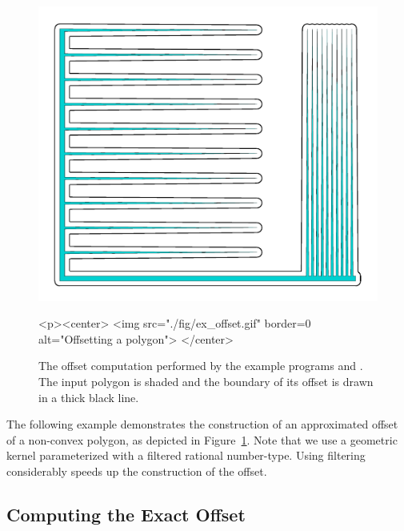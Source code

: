 \begin{figure}[t]
\begin{ccTexOnly}
  \begin{center}
    \includegraphics{Minkowski_sum_2/fig/ex_offset} 
  \end{center}
\end{ccTexOnly}
\begin{ccHtmlOnly}
  <p><center>
  <img src="./fig/ex_offset.gif" border=0 alt="Offsetting a polygon">
  </center>
\end{ccHtmlOnly}
\caption{The offset computation performed by the example programs
 and . The input polygon
is shaded and the boundary of its offset is drawn in a thick black line.}
\label{mink_fig:ex_offset}
\end{figure}

The following example demonstrates the construction of an approximated
offset of a non-convex polygon, as depicted in
Figure~\ref{mink_fig:ex_offset}. Note that we use a geometric kernel
parameterized with a filtered rational number-type. Using filtering
considerably speeds up the construction of the offset.


\subsection{Computing the Exact Offset}
\label{mink_ssec:exact_offset}

